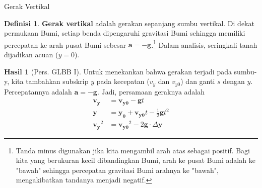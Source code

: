 \documentclass{beamer}
\theoremstyle{plain}
\theoremstyle{plain}
\theoremstyle{definition}
\newtheorem{defin}[teorema]{Definisi}
\newtheorem{corr}[teorema]{Hasil}
\numberwithin{equation}{section}
\begin{document}
	\begin{frame}{Gerak Vertikal}
		
		\begin{defin}
			\footnotesize
			\justifying \noindent \textbf{Gerak vertikal} adalah gerakan sepanjang sumbu vertikal. Di dekat permukaan Bumi, setiap benda dipengaruhi gravitasi Bumi sehingga memiliki percepatan ke arah pusat Bumi sebesar $\boldsymbol{a} = -\boldsymbol{g}$.\footnote{\tiny Tanda minus digunakan jika kita mengambil arah atas sebagai positif. Bagi kita yang berukuran kecil dibandingkan Bumi, arah ke pusat Bumi adalah ke "bawah" sehingga percepatan gravitasi Bumi arahnya ke "bawah", mengakibatkan tandanya menjadi negatif.} Dalam analisis, seringkali tanah dijadikan acuan ($y = 0$).
		\end{defin}
		
		
		\begin{corr}[Pers. GLBB I]
			\footnotesize \justifying Untuk menekankan bahwa gerakan terjadi pada sumbu-y, kita tambahkan subskrip $y$ pada kecepatan ($v_y$ dan $v_{y0}$) dan ganti $s$ dengan $y$. Percepatannya adalah $\boldsymbol{a} = -\boldsymbol{g}$. Jadi, persamaan geraknya adalah
			\begin{align}
				\boldsymbol{v_y} &= \boldsymbol{v_{y0}} - \boldsymbol{g}t\\
				\boldsymbol{y} &= \boldsymbol{y_0} + \boldsymbol{v_{y0}}t - \frac{1}{2} \boldsymbol{g}t^2\\
				\boldsymbol{v_y}^2 &= \boldsymbol{v_{y0}}^2 - 2\boldsymbol{g}\cdot\Delta\boldsymbol{y}
			\end{align}
		\end{corr}
		
%		
%		
	\end{frame}
	
\end{document}
